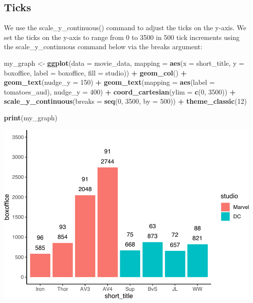 \documentclass[
]{krantz}
\makeatletter
\newenvironment{Shaded}{\begin{snugshade}}{\end{snugshade}}
\newcommand{\DataTypeTok}[1]{\textcolor[rgb]{0.27,0.27,0.27}{#1}}
\newcommand{\DecValTok}[1]{\textcolor[rgb]{0.06,0.06,0.06}{#1}}
\newcommand{\KeywordTok}[1]{\textcolor[rgb]{0.27,0.27,0.27}{\textbf{#1}}}
\newcommand{\NormalTok}[1]{#1}
\newcommand{\OperatorTok}[1]{\textcolor[rgb]{0.43,0.43,0.43}{\textbf{#1}}}
\newcommand{\StringTok}[1]{\textcolor[rgb]{0.5,0.5,0.5}{#1}}
\newenvironment{kframe}{%
\medskip{}
\setlength{\fboxsep}{.8em}
 \def\at@end@of@kframe{}%
 \ifinner\ifhmode%
  \def\at@end@of@kframe{\end{minipage}}%
  \begin{minipage}{\columnwidth}%
 \fi\fi%
 \def\FrameCommand##1{\hskip\@totalleftmargin \hskip-\fboxsep
 \colorbox{shadecolor}{##1}\hskip-\fboxsep
     \hskip-\linewidth \hskip-\@totalleftmargin \hskip\columnwidth}%
 \MakeFramed {\advance\hsize-\width
   \@totalleftmargin\z@ \linewidth\hsize
   \@setminipage}}%
 {\par\unskip\endMakeFramed%
 \at@end@of@kframe}
\renewenvironment{Shaded}{\begin{kframe}}{\end{kframe}}
\makeatother
\begin{document}
\hypertarget{ticks}{%
\subsection{Ticks}\label{ticks}}

We use the scale\_y\_continuous() command to adjust the ticks on the y-axis. We set the ticks on the y-axis to range from 0 to 3500 in 500 tick increments using the scale\_y\_continuous command below via the breaks argument:

\begin{Shaded}
\begin{Highlighting}[]
\NormalTok{my_graph <-}\StringTok{ }\KeywordTok{ggplot}\NormalTok{(}\DataTypeTok{data =}\NormalTok{ movie_data,}
           \DataTypeTok{mapping =} \KeywordTok{aes}\NormalTok{(}\DataTypeTok{x =}\NormalTok{ short_title,}
                         \DataTypeTok{y =}\NormalTok{ boxoffice,}
                         \DataTypeTok{label =}\NormalTok{ boxoffice, }
                         \DataTypeTok{fill =}\NormalTok{ studio)) }\OperatorTok{+}
\StringTok{  }\KeywordTok{geom_col}\NormalTok{() }\OperatorTok{+}
\StringTok{  }\KeywordTok{geom_text}\NormalTok{(}\DataTypeTok{nudge_y =} \DecValTok{150}\NormalTok{)  }\OperatorTok{+}
\StringTok{  }\KeywordTok{geom_text}\NormalTok{(}\DataTypeTok{mapping =} \KeywordTok{aes}\NormalTok{(}\DataTypeTok{label =}\NormalTok{ tomatoes_aud), }
            \DataTypeTok{nudge_y =} \DecValTok{400}\NormalTok{) }\OperatorTok{+}
\StringTok{  }\KeywordTok{coord_cartesian}\NormalTok{(}\DataTypeTok{ylim =} \KeywordTok{c}\NormalTok{(}\DecValTok{0}\NormalTok{, }\DecValTok{3500}\NormalTok{)) }\OperatorTok{+}
\StringTok{  }\KeywordTok{scale_y_continuous}\NormalTok{(}\DataTypeTok{breaks =} \KeywordTok{seq}\NormalTok{(}\DecValTok{0}\NormalTok{, }\DecValTok{3500}\NormalTok{, }\DataTypeTok{by =} \DecValTok{500}\NormalTok{)) }\OperatorTok{+}
\StringTok{  }\KeywordTok{theme_classic}\NormalTok{(}\DecValTok{12}\NormalTok{)}

\KeywordTok{print}\NormalTok{(my_graph)}
\end{Highlighting}
\end{Shaded}

\includegraphics[width=0.65\linewidth]{bookdown_files/figure-latex/unnamed-chunk-271-1}
\end{document}
